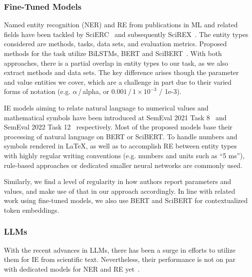 
\subsubsection{Fine-Tuned Models}


Named entity recognition (NER) and RE from publications in ML and related fields have been tackled by SciERC~\cite{luan2018scierc} and subsequently SciREX~\cite{Jain2020scirex}. The entity types considered are methods, tasks, data sets, and evaluation metrics. Proposed methods for the task utilize BiLSTMs, BERT and SciBERT~\cite{Beltagy2019}. With both approaches, there is a partial overlap in entity types to our task, as we also extract methods and data sets. The key difference arises though the parameter and value entities we cover, which are a challenge in part due to their varied forms of notation (e.g. $\alpha$\,/\,alpha, or $0.001$\,/\,$1\times 10^{-3}$ / 1e-3).

IE models aiming to relate natural language to numerical values and mathematical symbols have been introduced at SemEval 2021 Task 8~\cite{semeval21_task8} and SemEval 2022 Task 12~\cite{semeval22_task12} respectively. Most of the proposed models base their processing of natural language on BERT or SciBERT. To handle numbers and symbols rendered in \LaTeX, as well as to accomplish RE between entity types with highly regular writing conventions (e.g. numbers and units such as ``5 ms''), rule-based approaches or dedicated smaller neural networks are commonly used.

Similarly, we find a level of regularity in how authors report parameters and values, and make use of that in our approach accordingly. In line with related work using fine-tuned models, we also use BERT and SciBERT for contextualized token embeddings.

\subsubsection{LLMs}

With the recent advances in LLMs, there has been a surge in efforts to utilize them for IE from scientific text. Nevertheless, their performance is not on par with dedicated models for NER and RE yet~\cite{Yang2023}.

